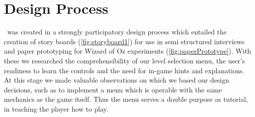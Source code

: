 \documentclass{chi-ext}
\begin{document}
\section{Design Process}
\drunkened\ was created in a strongly participatory design process which entailed the creation of story boards (\autoref{fig:storyboard1}) for use in semi structured interviews and paper prototyping for Wizard of Oz experiments (\autoref{fig:paperPrototype}).
With these we researched the comprehensibility of our level selection menu, the user's readiness to learn the controls and the need for in-game hints and explanations. At this stage we made valuable observations on which we based our design decisions, such as to implement a menu which is operable with the same mechanics as the game itself. Thus the menu serves a double purpose as tutorial, in teaching the player how to play.
\end{document}
